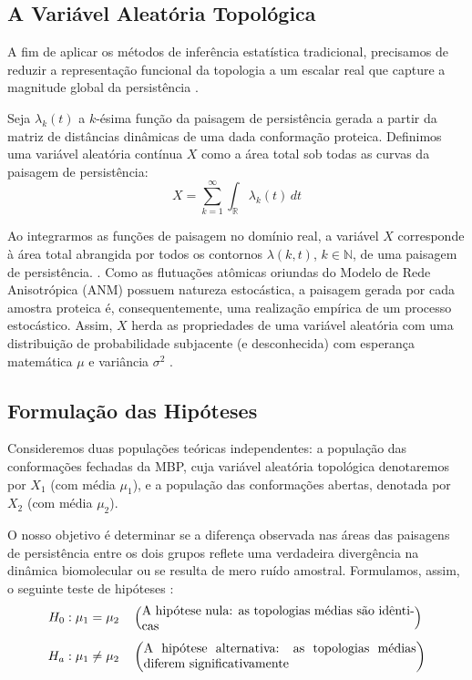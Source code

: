 \documentclass[12pt, a4paper]{article}
\theoremstyle{plain}
\theoremstyle{definition}
\theoremstyle{remark}
\newcommand{\ident}{\hspace{2em}}
\begin{document}
\subsection{A Variável Aleatória Topológica}

\ident A fim de aplicar os métodos de inferência estatística tradicional, precisamos de reduzir a representação funcional da topologia a um escalar real que capture a magnitude global da persistência \cite{kovacev2016}. 

\ident Seja $\lambda_k(t)$ a $k$-ésima função da paisagem de persistência gerada a partir da matriz de distâncias dinâmicas de uma dada conformação proteica. Definimos uma variável aleatória contínua $X$ como a área total sob todas as curvas da paisagem de persistência:
\begin{equation}
    X = \sum_{k=1}^{\infty} \int_{\mathbb{R}} \lambda_k(t) \, dt
\end{equation}

\ident Ao integrarmos as funções de paisagem no domínio real, a variável $X$ corresponde à área total abrangida por todos os contornos $\lambda(k, t)$, $k \in \mathbb{N}$, de uma paisagem de persistência. \cite{Bubenik2015}. Como as flutuações atômicas oriundas do Modelo de Rede Anisotrópica (ANM) possuem natureza estocástica, a paisagem gerada por cada amostra proteica é, consequentemente, uma realização empírica de um processo estocástico. Assim, $X$ herda as propriedades de uma variável aleatória com uma distribuição de probabilidade subjacente (e desconhecida) com esperança matemática $\mu$ e variância $\sigma^2$ \cite{devore2012}.

\subsection{Formulação das Hipóteses}

\ident Consideremos duas populações teóricas independentes: a população das conformações fechadas da MBP, cuja variável aleatória topológica denotaremos por $X_1$ (com média $\mu_1$), e a população das conformações abertas, denotada por $X_2$ (com média $\mu_2$). 

\ident O nosso objetivo é determinar se a diferença observada nas áreas das paisagens de persistência entre os dois grupos reflete uma verdadeira divergência na dinâmica biomolecular ou se resulta de mero ruído amostral. Formulamos, assim, o seguinte teste de hipóteses \cite{kovacev2016}:
\begin{align*}
    H_0 &: \mu_1 = \mu_2 \quad \left(\parbox{7.5cm}{A hipótese nula: as topologias médias são idênticas}\right) \\[0.5em]
    H_a &: \mu_1 \neq \mu_2 \quad \left(\parbox{7.5cm}{A hipótese alternativa: as topologias médias diferem significativamente}\right)
\end{align*}
\end{document}
